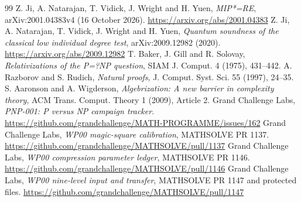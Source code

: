 \documentclass[11pt,a4paper]{article}
\begin{document}
\begin{thebibliography}{99}\small
{} Z. Ji, A. Natarajan, T. Vidick, J. Wright and H. Yuen, \emph{MIP*=RE}, arXiv:2001.04383v4 (16 October 2026). \url{https://arxiv.org/abs/2001.04383}
 Z. Ji, A. Natarajan, T. Vidick, J. Wright and H. Yuen, \emph{Quantum soundness of the classical low individual degree test}, arXiv:2009.12982 (2020). \url{https://arxiv.org/abs/2009.12982}
 T. Baker, J. Gill and R. Solovay, \emph{Relativizations of the P=?NP question}, SIAM J. Comput. 4 (1975), 431--442.
 A. Razborov and S. Rudich, \emph{Natural proofs}, J. Comput. Syst. Sci. 55 (1997), 24--35.
 S. Aaronson and A. Wigderson, \emph{Algebrization: A new barrier in complexity theory}, ACM Trans. Comput. Theory 1 (2009), Article 2.
 Grand Challenge Labs, \emph{PNP-001: P versus NP campaign tracker}. \url{https://github.com/grandchallenge/MATH-PROGRAMME/issues/162}
 Grand Challenge Labs, \emph{WP00 magic-square calibration}, MATHSOLVE PR 1137. \url{https://github.com/grandchallenge/MATHSOLVE/pull/1137}
 Grand Challenge Labs, \emph{WP00 compression parameter ledger}, MATHSOLVE PR 1146. \url{https://github.com/grandchallenge/MATHSOLVE/pull/1146}
 Grand Challenge Labs, \emph{WP00 nine-level input and transfer}, MATHSOLVE PR 1147 and protected files. \url{https://github.com/grandchallenge/MATHSOLVE/pull/1147}
\end{thebibliography}
\end{document}
